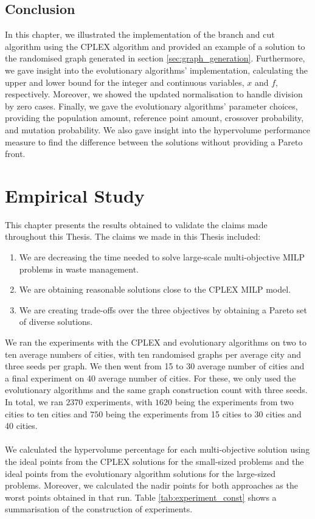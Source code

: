 \documentclass[mscthesis, 11pt]{usiinfthesis}
\theoremstyle{newdefinition}
\begin{document}
\section{Conclusion}
In this chapter, we illustrated the implementation of the branch and cut algorithm using the CPLEX algorithm and provided an example of a solution to the randomised graph generated in section \ref{sec:graph_generation}. Furthermore, we gave insight into the evolutionary algorithms' implementation, calculating the upper and lower bound for the integer and continuous variables, $x$ and $f$, respectively. Moreover, we showed the updated normalisation to handle division by zero cases. Finally, we gave the evolutionary algorithms' parameter choices, providing the population amount, reference point amount, crossover probability, and mutation probability. We also gave insight into the hypervolume performance measure to find the difference between the solutions without providing a Pareto front.
\chapter[Empirical Study]{Empirical Study}\label{chapter:results}
This chapter presents the results obtained to validate the claims made throughout this Thesis. The claims we made in this Thesis included:

\begin{enumerate}
    \item We are decreasing the time needed to solve large-scale multi-objective MILP problems in waste management.
    \item We are obtaining reasonable solutions close to the CPLEX MILP model.
    \item We are creating trade-offs over the three objectives by obtaining a Pareto set of diverse solutions.
\end{enumerate}
We ran the experiments with the CPLEX and evolutionary algorithms on two to ten average numbers of cities, with ten randomised graphs per average city and three seeds per graph. We then went from 15 to 30 average number of cities and a final experiment on 40 average number of cities. For these, we only used the evolutionary algorithms and the same graph construction count with three seeds. In total, we ran $2370$ experiments, with $1620$ being the experiments from two cities to ten cities and $750$ being the experiments from 15 cities to 30 cities and 40 cities.
\\\\
We calculated the hypervolume percentage for each multi-objective solution using the ideal points from the CPLEX solutions for the small-sized problems and the ideal points from the evolutionary algorithm solutions for the large-sized problems. Moreover, we calculated the nadir points for both approaches as the worst points obtained in that run. Table \ref{tab:experiment_const} shows a summarisation of the construction of experiments.
\end{document}
